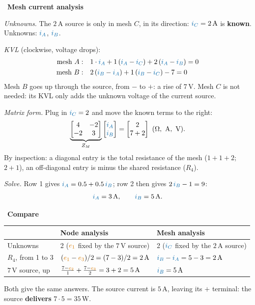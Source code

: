 \documentclass[11pt,a4paper]{article}
\newcommand{\Icol}[1]{\textcolor{ccur}{#1}}
\newcommand{\Vcol}[1]{\textcolor{cvolt}{#1}}
\newcommand{\uni}[1]{\,\mathrm{#1}}
\newcommand{\A}{\uni{A}}   \newcommand{\V}{\uni{V}}
\newcommand{\W}{\uni{W}}   \newcommand{\J}{\uni{J}}
\newif\ifsolfirst
\newcommand{\solstep}[2]{\par\ifsolfirst\global\solfirstfalse\else\medskip\needspace{5\baselineskip}\fi
  \noindent{\color{cpow}\bfseries Step #1.}\ {\bfseries #2}\par\nobreak\smallskip}
\begin{document}
\solstep{c}{Mesh current analysis}
\emph{Unknowns.} The $2\A$ source is only in mesh $C$, in its direction:
$\Icol{i_C} = 2\A$ is \textbf{known}. Unknowns: $\Icol{i_A}$, $\Icol{i_B}$.

\emph{KVL} (clockwise, voltage drops):
\begin{align*}
  \text{mesh } A:\quad & 1\cdot\Icol{i_A} + 1\,(\Icol{i_A} - \Icol{i_C})
                         + 2\,(\Icol{i_A} - \Icol{i_B}) = 0\\
  \text{mesh } B:\quad & 2\,(\Icol{i_B} - \Icol{i_A}) + 1\,(\Icol{i_B} - \Icol{i_C}) - 7 = 0
\end{align*}
Mesh $B$ goes up through the source, from $-$ to $+$: a rise of $7\V$. Mesh $C$ is not needed:
its KVL only adds the unknown voltage of the current source.

\emph{Matrix form.} Plug in $\Icol{i_C} = 2$ and move the known terms to the right:
\[
  \underbrace{\begin{bmatrix} 4 & -2\\ -2 & 3 \end{bmatrix}}_{Z_M}
  \begin{bmatrix} \Icol{i_A}\\ \Icol{i_B} \end{bmatrix}
  = \begin{bmatrix} 2\\ 7 + 2 \end{bmatrix} \ \mathrm{(\Omega,\ A,\ V)} .
\]
By inspection: a diagonal entry is the total resistance of the mesh ($1 + 1 + 2$; $2 + 1$), an
off-diagonal entry is minus the shared resistance ($R_4$).

\emph{Solve.} Row 1 gives $\Icol{i_A} = 0.5 + 0.5\,\Icol{i_B}$; row 2 then gives
$2\,\Icol{i_B} - 1 = 9$:
\[
  \Icol{i_A} = 3\A, \qquad \Icol{i_B} = 5\A .
\]

\solstep{d}{Compare}
\begin{center}
\small
\renewcommand{\arraystretch}{1.35}
\begin{tabular}{@{}lll@{}}
\toprule
 & \textbf{Node analysis} & \textbf{Mesh analysis}\\
\midrule
Unknowns & 2 ($\Vcol{e_1}$ fixed by the $7\V$ source) & 2 ($\Icol{i_C}$ fixed by the $2\A$ source)\\
$R_4$, from 1 to 3 & $(\Vcol{e_1} - \Vcol{e_3})/2 = (7 - 3)/2 = 2\A$ & $\Icol{i_B} - \Icol{i_A} = 5 - 3 = 2\A$\\
$7\V$ source, up & $\frac{7 - \Vcol{e_2}}{1} + \frac{7 - \Vcol{e_3}}{2} = 3 + 2 = 5\A$ & $\Icol{i_B} = 5\A$\\
\bottomrule
\end{tabular}
\end{center}
Both give the same answers. The source current is $5\A$, leaving its $+$ terminal: the source
\textbf{delivers} $7 \cdot 5 = 35\W$.
\end{document}
